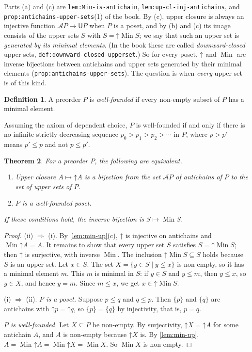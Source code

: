 \documentclass[11pt,a4paper]{article}
\theoremstyle{plain}
\newtheorem{theorem}{Theorem}[section]
\theoremstyle{definition}
\newtheorem{definition}[theorem]{Definition}
\theoremstyle{remark}
\newcommand{\U}{\mathsf{U}}
\newcommand{\An}{\mathcal{A}}
\newcommand{\up}{\mathord{\uparrow}}
\DeclareMathOperator{\Min}{Min}
\newcommand{\lbl}[1]{\nolinkurl{#1}}
\begin{document}
Parts (a) and (c) are \lbl{lem:Min-is-antichain}, \lbl{lem:up-cl-inj-antichains}, and \lbl{prop:antichains-upper-sets}(1) of the book.
By (c), upper closure is always an injective function $\An P \to \U P$ when $P$ is a poset, and by (b) and (c) its image consists of the upper sets $S$ with $S = \up \Min S$; we say that such an upper set is \emph{generated by its minimal elements}.
(In the book these are called \emph{downward-closed} upper sets, \lbl{def:downward-closed-upperset}.)
So for every poset, $\up$ and $\Min$ are inverse bijections between antichains and upper sets generated by their minimal elements (\lbl{prop:antichains-upper-sets}).
The question is when \emph{every} upper set is of this kind.

\begin{definition}
    A preorder $P$ is \emph{well-founded} if every non-empty subset of $P$ has a minimal element.
\end{definition}

Assuming the axiom of dependent choice, $P$ is well-founded if and only if there is no infinite strictly decreasing sequence $p_0 > p_1 > p_2 > \cdots$ in $P$, where $p > p'$ means $p' \leq p$ and not $p \leq p'$.

\begin{theorem}
    \label{thm:antichains-wf}
    For a preorder $P$, the following are equivalent.
    \begin{enumerate}[label=(\roman*)]
        \item Upper closure $A \mapsto \up A$ is a bijection from the set $\An P$ of antichains of $P$ to the set of upper sets of $P$.
        \item $P$ is a well-founded poset.
    \end{enumerate}
    If these conditions hold, the inverse bijection is $S \mapsto \Min S$.
\end{theorem}
\begin{proof}
    (ii) $\Rightarrow$ (i).
    By \cref{lem:min-up}(c), $\up$ is injective on antichains and $\Min \up A = A$.
    It remains to show that every upper set $S$ satisfies $S = \up \Min S$; then $\up$ is surjective, with inverse $\Min$.
    The inclusion $\up \Min S \subseteq S$ holds because $S$ is an upper set.
    Let $x \in S$.
    The set $X = \{ y \in S \mid y \leq x \}$ is non-empty, so it has a minimal element $m$.
    This $m$ is minimal in $S$: if $y \in S$ and $y \leq m$, then $y \leq x$, so $y \in X$, and hence $y = m$.
    Since $m \leq x$, we get $x \in \up \Min S$.

    (i) $\Rightarrow$ (ii).
    \emph{$P$ is a poset.}
    Suppose $p \leq q$ and $q \leq p$.
    Then $\{p\}$ and $\{q\}$ are antichains with $\up p = \up q$, so $\{p\} = \{q\}$ by injectivity, that is, $p = q$.

    \emph{$P$ is well-founded.}
    Let $X \subseteq P$ be non-empty.
    By surjectivity, $\up X = \up A$ for some antichain $A$, and $A$ is non-empty because $\up X$ is.
    By \cref{lem:min-up}, $A = \Min \up A = \Min \up X = \Min X$.
    So $\Min X$ is non-empty.
\end{proof}
\end{document}
